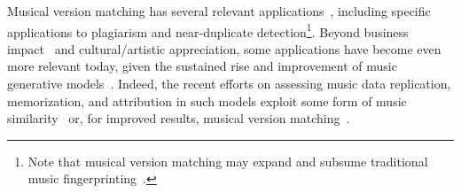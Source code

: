 Musical version matching has several relevant applications~\cite{serra_identification_2011, yesiler_audio-based_2021}, %
including specific applications to plagiarism and near-duplicate detection\footnote{Note that musical version matching may expand and subsume traditional music fingerprinting~\citep{cano_review_2005}.}. %
Beyond business impact~\cite{page_music_2023} and cultural/artistic appreciation, some applications have become even more relevant today, given the sustained rise and improvement of music generative models~\citep[e.g.,][]{copet_simple_2023, evans_fast_2024, liu_audioldm_2024}. Indeed, the recent efforts on assessing music data replication, memorization, and attribution in such models exploit some form of music similarity~\cite{barnett_exploring_2024, bralios_generation_2024} or, for improved results, musical version matching~\cite{batlle-roca_towards_2024}. 

